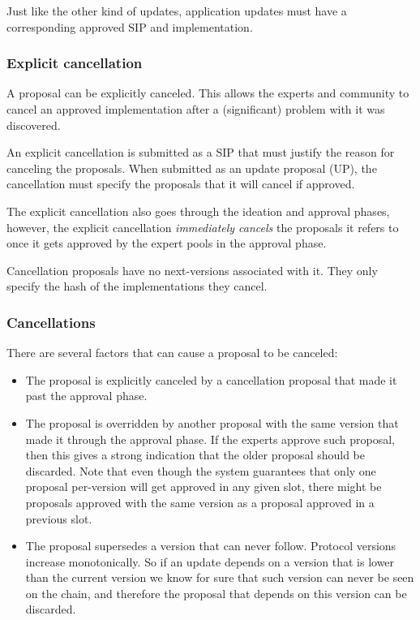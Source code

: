 Just like the other kind of updates, application updates must have a
corresponding approved SIP and implementation.

\subsubsection{Explicit cancellation}
\label{sec:explicit-cancellation}

A proposal can be explicitly canceled. This allows the experts and community to
cancel an approved implementation after a (significant) problem with it was
discovered.

An explicit cancellation is submitted as a SIP that must justify the reason for
canceling the proposals. When submitted as an update proposal (UP), the
cancellation must specify the proposals that it will cancel if approved.

The explicit cancellation also goes through the ideation and approval phases,
however, the explicit cancellation \emph{immediately cancels} the proposals it
refers to once it gets approved by the expert pools in the approval phase.

Cancellation proposals have no next-versions associated with it. They only
specify the hash of the implementations they cancel.

\subsubsection{Cancellations}
\label{sec:cancellations}

There are several factors that can cause a proposal to be canceled:

\begin{itemize}
\item The proposal is explicitly canceled by a cancellation proposal that made
  it past the approval phase.
\item The proposal is overridden by another proposal with the same version that
  made it through the approval phase. If the experts approve such proposal, then
  this gives a strong indication that the older proposal should be discarded.
  Note that even though the system guarantees that only one proposal per-version
  will get approved in any given slot, there might be proposals approved with
  the same version as a proposal approved in a previous slot.
\item The proposal supersedes a version that can never follow. Protocol versions
  increase monotonically. So if an update depends on a version that is lower
  than the current version we know for sure that such version can never be seen
  on the chain, and therefore the proposal that depends on this version can be
  discarded.
\end{itemize}

